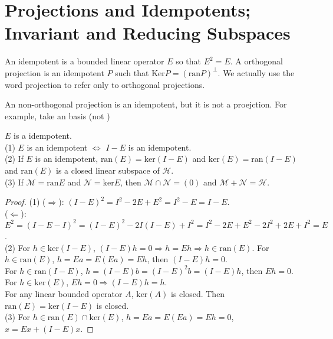 \chapter{Projections and Idempotents; Invariant and 
Reducing Subspaces}\label{chp:2_3}

\begin{definition}{}{}
    An idempotent is a bounded linear operator $E$ so that $E^2=E$.
    A orthogonal projection is an idempotent $P$ such that $\text{Ker} P=(\text{ran} P)^{\perp}$.
    We actually use the word projection to refer only to orthogonal projections.
\end{definition}

\begin{remark}
    An non-orthogonal projection is an idempotent, but it is not a
proejction. For example, take an basis (not )
\end{remark}

\begin{proposition}{}{}
    $E$ is a idempotent.\\
    (1) $E$ is an idempotent $\Leftrightarrow$ $I-E$ is an idempotent.\\
    (2) If $E$ is an idempotent, $\text{ran}(E)=\text{ker}(I-E)$ and $\text{ker}(E)=\text{ran}(I-E)$
    and $\text{ran}(E)$ is a closed linear subspace of $\mathscr{H}$.\\
    (3) If $\mathscr{M}=\text{ran}E$ and $\mathscr{N}=\text{ker} E$, then $\mathscr{M}\cap \mathscr{N}=(0)$
    and $\mathscr{M}+\mathscr{N}=\mathscr{H}$. 
\end{proposition}
\begin{proof}
    (1) ($\Rightarrow$):
        $(I-E)^2=I^2-2E+E^2=I^2-E=I-E$.\\
        ($\Leftarrow$):
        $E^2=(I-E-I)^2=(I-E)^2-2I(I-E)+I^2=I^2-2E+E^2-2I^2+2E+I^2=E$.\\
    (2) For $h\in \text{ker}(I-E)$, $(I-E)h=0\Rightarrow h=Eh\Rightarrow h\in\text{ran}(E)$.
    For $h\in \text{ran}(E)$, $h=Ea=E(Ea)=Eh$, then $(I-E)h=0$.\\
    For $h\in \text{ran}(I-E)$, $h=(I-E)b=(I-E)^2b=(I-E)h$, then $Eh=0$.
    For $h\in \text{ker}(E)$, $Eh=0\Rightarrow (I-E)h=h$.\\
    For any linear bounded operator $A$, $\text{ker}(A)$ is closed.
    Then $\text{ran}(E)=\text{ker}(I-E)$ is closed.\\
    (3) For $h\in \text{ran}(E)\cap \text{ker}(E)$, $h=Ea=E(Ea)=Eh=0$, $x=Ex+(I-E)x$.
\end{proof}

